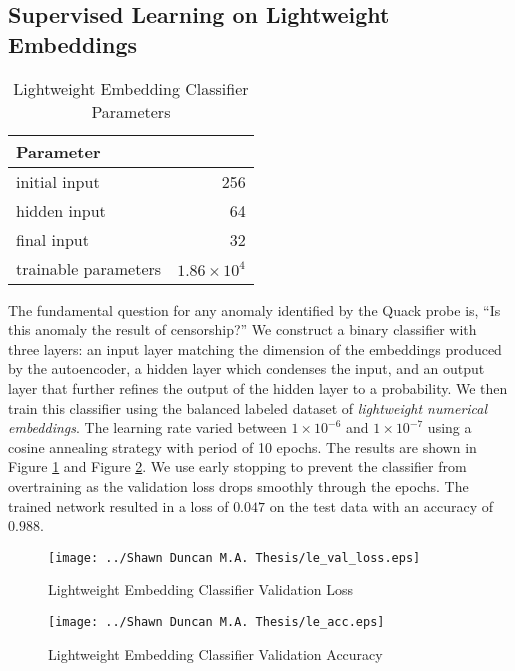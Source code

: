 \subsection{Supervised Learning on Lightweight Embeddings}\label{subsec:super}
\begin{table}[h]
  \caption{Lightweight Embedding Classifier Parameters}
  \label{tab:le_params}
  \begin{tabular}{p{} r}
    \toprule
    Parameter & \\
    \midrule
    initial input & 256 \\
    hidden input & 64 \\
    final input & 32 \\ 
    \midrule
    trainable parameters &  $1.86 \times 10^{4}$ \\
    \bottomrule
  \end{tabular}
\end{table}
The fundamental question for any anomaly identified by the Quack probe is, ``Is this anomaly the result of censorship?'' We construct a binary classifier with three layers: an input layer matching the dimension of the embeddings produced by the autoencoder, a hidden layer which condenses the input, and an output layer that further refines the output of the hidden layer to a probability. We then train this classifier using the balanced labeled dataset of \textit{lightweight numerical embeddings}. The learning rate varied between $1 \times 10^{-6}$ and $1 \times 10^{-7}$ using a cosine annealing strategy with period of 10 epochs.  The results are shown in Figure \ref{fig:le_val_loss} and Figure \ref{fig:le_val_acc}. We use early stopping to prevent the classifier from overtraining as the validation loss drops smoothly through the epochs. The trained network resulted in a loss of $0.047$ on the test data with an accuracy of $0.988$.

\begin{figure}[hbt]
    \centering
    \texttt{[image: ../Shawn Duncan M.A. Thesis/le\_val\_loss.eps]}
    \caption{Lightweight Embedding Classifier Validation Loss}
    \label{fig:le_val_loss}
\end{figure}

\begin{figure}[hbt]
    \centering
    \texttt{[image: ../Shawn Duncan M.A. Thesis/le\_acc.eps]}
    \caption{Lightweight Embedding Classifier Validation Accuracy}
    \label{fig:le_val_acc}
\end{figure}


